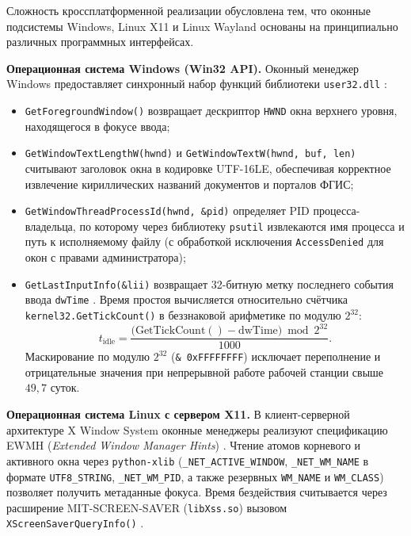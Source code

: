 \documentclass{timcw}
\begin{document}
Сложность кроссплатформенной реализации обусловлена тем, что оконные подсистемы Windows, Linux X11 и Linux Wayland основаны на принципиально различных программных интерфейсах.

\textbf{Операционная система Windows (Win32 API).} Оконный менеджер Windows предоставляет синхронный набор функций библиотеки \texttt{user32.dll} \cite{winapi_fg}:
\begin{itemize}
  \item \texttt{GetForegroundWindow()} возвращает дескриптор \texttt{HWND} окна верхнего уровня, находящегося в фокусе ввода;
  \item \texttt{GetWindowTextLengthW(hwnd)} и \texttt{GetWindowTextW(hwnd, buf, len)} считывают заголовок окна в кодировке UTF-16LE, обеспечивая корректное извлечение кириллических названий документов и порталов ФГИС;
  \item \texttt{GetWindowThreadProcessId(hwnd, \&pid)} определяет PID процесса-владельца, по которому через библиотеку \texttt{psutil} \cite{psutil_docs} извлекаются имя процесса и путь к исполняемому файлу (с обработкой исключения \texttt{AccessDenied} для окон с правами администратора);
  \item \texttt{GetLastInputInfo(\&lii)} возвращает 32-битную метку последнего события ввода \texttt{dwTime} \cite{winapi_idle}. Время простоя вычисляется относительно счётчика \texttt{kernel32.GetTickCount()} в беззнаковой арифметике по модулю $2^{32}$:
  \begin{equation}\label{eq:win_idle}
    t_{\text{idle}} = \frac{\bigl(\mathrm{GetTickCount}() - \mathrm{dwTime}\bigr) \bmod 2^{32}}{1000}.
  \end{equation}
  Маскирование по модулю $2^{32}$ (\texttt{\& 0xFFFFFFFF}) исключает переполнение и отрицательные значения при непрерывной работе рабочей станции свыше $49{,}7$ суток.
\end{itemize}

\textbf{Операционная система Linux с сервером X11.} В клиент-серверной архитектуре X Window System оконные менеджеры реализуют спецификацию EWMH (\emph{Extended Window Manager Hints}) \cite{ewmh}. Чтение атомов корневого и активного окна через \texttt{python-xlib} (\texttt{\_NET\_ACTIVE\_WINDOW}, \texttt{\_NET\_WM\_NAME} в формате \texttt{UTF8\_STRING}, \texttt{\_NET\_WM\_PID}, а также резервных \texttt{WM\_NAME} и \texttt{WM\_CLASS}) позволяет получить метаданные фокуса. Время бездействия считывается через расширение MIT-SCREEN-SAVER (\texttt{libXss.so}) вызовом \texttt{XScreenSaverQueryInfo()} \cite{xlib_manual}.
\end{document}
